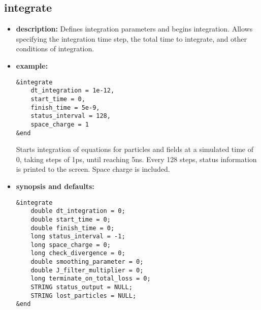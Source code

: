 %
\newpage

\subsection{integrate}

\begin{itemize}

\item {\bf description:}
Defines integration parameters and begins integration.  Allows
specifying the integration time step, the total time to integrate, and
other conditions of integration.

\item {\bf example:} 
\begin{verbatim}
&integrate
    dt_integration = 1e-12,
    start_time = 0,
    finish_time = 5e-9,
    status_interval = 128,
    space_charge = 1
&end
\end{verbatim}
Starts integration of equations for particles and fields
at a simulated time of 0, taking steps of 1ps, until reaching
5ns.  Every 128 steps, status information is printed to the
screen.  Space charge is included.

\item {\bf synopsis and defaults:} 
\begin{verbatim}
&integrate
    double dt_integration = 0;
    double start_time = 0;
    double finish_time = 0;
    long status_interval = -1;
    long space_charge = 0;
    long check_divergence = 0;
    double smoothing_parameter = 0;
    double J_filter_multiplier = 0;  
    long terminate_on_total_loss = 0;
    STRING status_output = NULL;
    STRING lost_particles = NULL;
&end
\end{verbatim}


\end{itemize}
